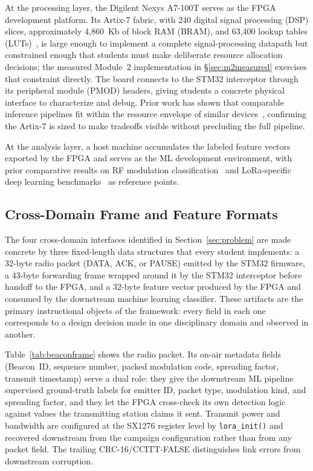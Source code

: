 \documentclass[conference]{IEEEtran}
\begin{document}
At the processing layer, the Digilent Nexys A7-100T serves as the FPGA development platform. Its Artix-7 fabric, with 240 digital signal processing (DSP) slices, approximately 4{,}860~Kb of block RAM (BRAM), and 63{,}400 lookup tables (LUTs)~\cite{b11}, is large enough to implement a complete signal-processing datapath but constrained enough that students must make deliberate resource allocation decisions; the measured Module~2 implementation in \S\ref{sec:m2measured} exercises that constraint directly. The board connects to the STM32 interceptor through its peripheral module (PMOD) headers, giving students a concrete physical interface to characterize and debug. Prior work has shown that comparable inference pipelines fit within the resource envelope of similar devices~\cite{b1,b3}, confirming the Artix-7 is sized to make tradeoffs visible without precluding the full pipeline. %

At the analysis layer, a host machine accumulates the labeled feature vectors exported by the FPGA and serves as the ML development environment, with prior comparative results on RF modulation classification~\cite{b4} and LoRa-specific deep learning benchmarks~\cite{b5} as reference points.

\subsection{Cross-Domain Frame and Feature Formats}\label{sec:proto}

The four cross-domain interfaces identified in Section~\ref{sec:problem} are made concrete by three fixed-length data structures that every student implements: a 32-byte radio packet (DATA, ACK, or PAUSE) emitted by the STM32 firmware, a 43-byte forwarding frame wrapped around it by the STM32 interceptor before handoff to the FPGA, and a 32-byte feature vector produced by the FPGA and consumed by the downstream machine learning classifier. These artifacts are the primary instructional objects of the framework: every field in each one corresponds to a design decision made in one disciplinary domain and observed in another.

Table~\ref{tab:beaconframe} shows the radio packet. Its on-air metadata fields (Beacon~ID, sequence number, packed modulation code, spreading factor, transmit timestamp) serve a dual role: they give the downstream ML pipeline supervised ground-truth labels for emitter ID, packet type, modulation kind, and spreading factor, and they let the FPGA cross-check its own detection logic against values the transmitting station claims it sent. Transmit power and bandwidth are configured at the SX1276 register level by \texttt{lora\_init()} and recovered downstream from the campaign configuration rather than from any packet field. The trailing CRC-16/CCITT-FALSE distinguishes link errors from downstream corruption.
\end{document}
